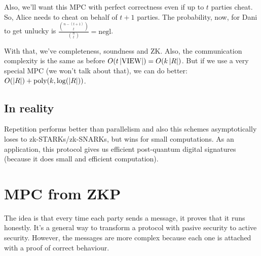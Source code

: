   Also, we'll want this MPC with perfect correctness even if up to $t$ parties cheat.
  So, Alice needs to cheat on behalf of $t+1$ parties.
  The probability, now, for Dani to get unlucky is $\frac{\binom{n-(t+1)}{t}}{\binom{n}{t}} = \text{negl}$.

  With that, we've completeness, soundness and ZK.
  Also, the communication complexity is the same as before $O(t\left| \text{VIEW} \right|) = O(k\left| R \right|)$.
  But if we use a very special MPC (we won't talk about that), we can do better:
  $O(\left| R \right|) + \text{poly}(k,\log(\left| R \right|))$.

  \subsection{In reality}
  Repetition performs better than parallelism and also this schemes asymptotically 
  loses to zk-STARKs/zk-SNARKs, but wins for small computations.
  As an application, this protocol gives us efficient post-quantum digital signatures
  (because it does small and efficient computation).

  \section{MPC from ZKP}
  The idea is that every time each party sends a message, it proves that it runs honestly.
  It's a general way to transform a protocol with pasive security to active security.
  However, the messages are more complex because each one is attached with a proof of correct behaviour.

